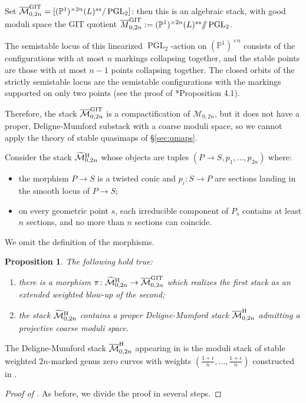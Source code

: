 \documentclass{amsart}
\newcommand{\bP}{\mathbb{P}}
\newcommand{\PGL}{\operatorname{PGL}}
\newcommand{\Mcal}{\mathcal{M}}
\newcommand{\Mbar}{\overline{\mathcal{M}}}
\newcommand{\Mtilde}{\widetilde{\mathcal{M}}}
\newcommand{\Hass}{{\rm H}}
\newcommand{\git}{{\rm GIT}}
\newtheorem{Prop}[theorem]{Proposition}
\theoremstyle{definition}
\theoremstyle{definition}
\begin{document}
{Set $\Mbar_{0,2n}^\git=[(\bP^1)^{\times 2n}(L)^{ss}/\PGL_2]$: then this is an algebraic stack, with good moduli space the GIT quotient $\overline{M}_{0,2n}^{\git}:=(\bP^1)^{\times 2n}(L)^{ss}/\!\!/\PGL_2$. 

The semistable locus of this linearized $\PGL_2$-action on $(\bP^1)^{\times n}$ consists of the configurations with at most $n$ markings collapsing together, and the stable points are those with at most $n-1$ points collapsing together. The closed orbits of the strictly semistable locus are the semistable configurations with the markings supported on only two points (see the proof of \cite{MFK}*{Proposition 4.1}).

Therefore, the stack $\Mbar_{0,2n}^{\git}$ is a compactification of $\Mcal_{0,2n}$, but it does not have a proper, Deligne-Mumford substack with a coarse moduli space, so we cannot apply the theory of stable quasimaps of \S \ref{sec:qmaps}. 

Consider the stack $\Mtilde_{0,2n}^{\Hass}$ whose objects are tuples $(P\to S,p_1,\ldots,p_{2n})$ where:
\begin{itemize}
    \item the morphism $P\to S$ is a twisted conic and $p_i\colon S \to P$ are sections landing in the smooth locus of $P\to S$;
    \item on every geometric point $s$, each irreducible component of $P_s$ contains at least $n$ sections, and no more than $n$ sections can coincide.
\end{itemize}
We omit the definition of the morphisms.
\begin{Prop}\label{prop:hass to git}
    The following hold true:
    \begin{enumerate}
        \item there is a morphism $\pi\colon \Mtilde^{\Hass}_{0,2n}\to\Mbar^{\git}_{0,2n}$ which realizes the first stack as an extended weighted blow-up of the second;
        \item the stack $\Mtilde^{\Hass}_{0,2n}$ contains a proper Deligne-Mumford stack $\Mbar_{0,2n}^{\Hass}$ admitting a projective coarse moduli space.
    \end{enumerate}
\end{Prop}
The Deligne-Mumford stack $\Mbar_{0,2n}^{\Hass}$ appearing in  is the moduli stack of stable weighted $2n$-marked genus zero curves with weights $(\frac{1+\epsilon}{n},\ldots,\frac{1+\epsilon}{n})$ constructed in \cite{Hassett_w}.

\begin{proof}[Proof of ]
    As before, we divide the proof in several steps.


\end{proof}}
\end{document}
